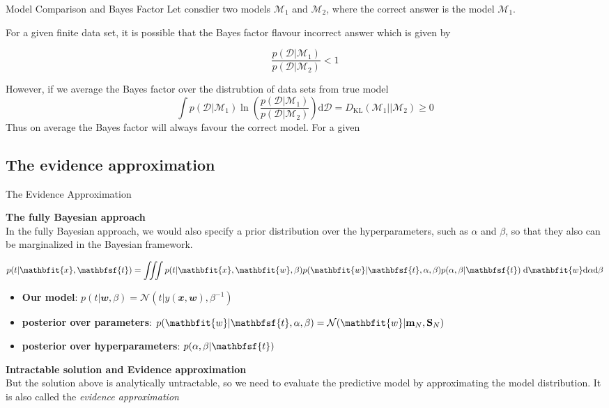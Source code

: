 \documentclass{bredelebeamer}
\begin{document}
\begin{frame}{Model Comparison and Bayes Factor}
  Let consdier two models $\mathcal{M}_1$ and $\mathcal{M}_2$, where the correct
  answer is the model $\mathcal{M}_1$.

  For a given finite data set, it is possible that the Bayes factor flavour
  incorrect answer which is given by

  \begin{equation}
     \frac{p(\mathcal{D}|\mathcal{M}_1)}{p(\mathcal{D}|\mathcal{M}_2)} < 1
  \end{equation}

  However, if we average the Bayes factor over the distrubtion of data sets from
  true model
  \begin{equation}
    \int p(\mathcal{D}|\mathcal{M}_1)
    \ln
      \left(
        \frac{p(\mathcal{D}|\mathcal{M}_1)}{p(\mathcal{D}|\mathcal{M}_2)}
      \right)
    \mathrm{d}\mathcal{D}
    = D_{\textrm{KL}} (\mathcal{M}_1||\mathcal{M}_2) \geq 0
  \end{equation}
  Thus on average the Bayes factor will always favour the correct model.
  For a given
\end{frame}

\subsection{The evidence approximation}
\begin{frame}{The Evidence Approximation}

  \textbf{The fully Bayesian approach} \\
  In the fully Bayesian approach, we would also specify a prior distribution over
  the hyperparameters, such as $\alpha$ and $\beta$, so that they also can be
  marginalized in the Bayesian framework.

  \begin{equation}
    p(t|\mathbfit{x},\mathbfsf{t}) =
    \iiint
    p(t|\mathbfit{x},\mathbfit{w},\beta)
    p(\mathbfit{w}|\mathbfsf{t},\alpha,\beta)
    p(\alpha,\beta|\mathbfsf{t})
    \;
    \mathrm{d}\mathbfit{w}
    \mathrm{d}\alpha
    \mathrm{d}\beta
  \end{equation}

  \begin{itemize}
    \item \textbf{Our model}:
    $p(t|\mathbfit{w}, \beta) = \mathcal{N}(t|y(\mathbfit{x}, \mathbfit{w}), \beta^{-1})$
    \item \textbf{posterior over parameters}:
    $p(\mathbfit{w}|\mathbfsf{t},\alpha,\beta) = \mathcal{N}(\mathbfit{w}|\mathbf{m}_N, \mathbf{S}_N)$
    \item \textbf{posterior over hyperparameters}:
    $p(\alpha, \beta | \mathbfsf{t})$
  \end{itemize}

  \vspace{0.5\baselineskip}
  \textbf{Intractable solution and Evidence approximation} \\
  But the solution above is analytically untractable, so we need to evaluate the
  predictive model by approximating the model distribution. It is also called
  the \textit{evidence approximation}
\end{frame}
\end{document}
